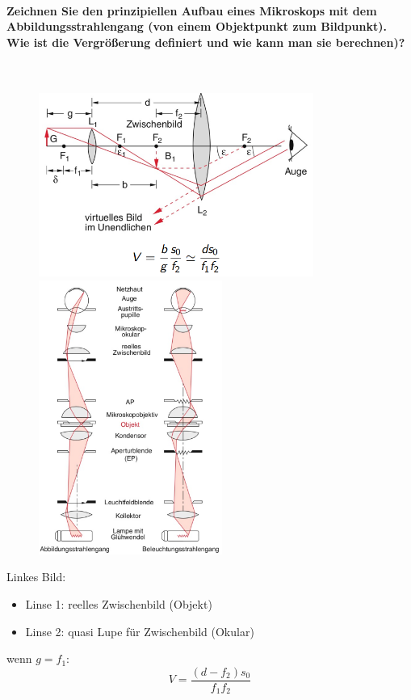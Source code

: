 \documentclass[a4paper, 11pt, ngerman, parskip=half-]{scrartcl}
\begin{document}
    \paragraph{Zeichnen Sie den prinzipiellen Aufbau eines Mikroskops mit dem Abbildungsstrahlengang
        (von einem Objektpunkt zum Bildpunkt). Wie ist die Vergrößerung definiert und wie kann man sie
        berechnen)?} ~
    \begin{figure}[H]
        \centering
        \begin{minipage}[b]{0.3\textwidth}
            \centering
            \includegraphics[width=9cm]{image/20/5.png}
        \end{minipage}
        \hspace{5cm}
        \begin{minipage}[b]{0.3\textwidth}
            \centering
            \includegraphics[width=6cm]{image/20/6.png}
        \end{minipage}
    \end{figure}
    Linkes Bild:
    \begin{itemize}
        \item Linse 1: reelles Zwischenbild (Objekt)
        \item Linse 2: quasi Lupe für Zwischenbild (Okular)
    \end{itemize}
    wenn $g = f_1$:
    \begin{equation}
        V = \frac{(d- f_2)s_0}{f_1 f_2}
    \end{equation}
\end{document}
